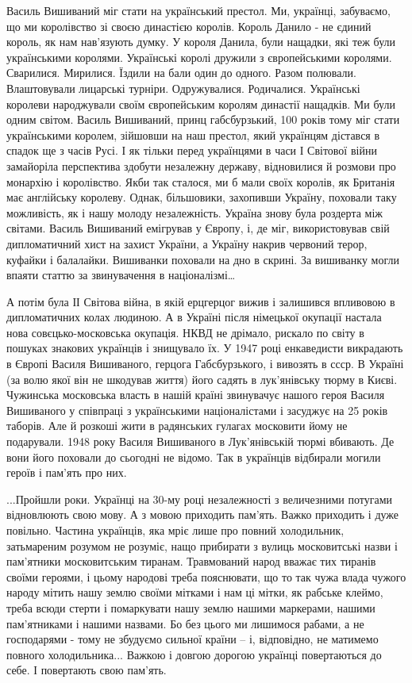 Василь Вишиваний міг стати на український престол. Ми, українці, забуваємо, що
ми королівство зі своєю династією королів. Король Данило - не єдиний король, як
нам нав'язують думку. У короля Данила, були нащадки, які теж були українськими
королями. Українські королі дружили з європейськими королями. Сварилися.
Мирилися. Їздили на бали один до одного. Разом полювали. Влаштовували лицарські
турніри. Одружувалися. Родичалися. Українські королеви народжували своїм
європейським королям династії нащадків. Ми були одним світом. Василь Вишиваний,
принц габсбурзький, 100 років тому міг стати українськими королем, зійшовши на
наш престол, який українцям дістався в спадок ще з часів Русі. І як тільки
перед українцями в часи І Світової війни замайоріла перспектива здобути
незалежну державу, відновилися й розмови про монархію і королівство. Якби так
сталося, ми б мали своїх королів, як Британія має англійську королеву. Однак,
більшовики, захопивши Україну, поховали таку можливість, як і нашу молоду
незалежність. Україна знову була роздерта між світами. Василь Вишиваний
емігрував у Європу, і, де міг, використовував свій дипломатичний хист на захист
України, а Україну накрив червоний терор, куфайки і балалайки. Вишиванки
поховали на дно в скрині. За вишиванку могли впаяти статтю за звинувачення в
націоналізмі…

А потім була ІІ Світова війна, в якій ерцгерцог вижив і залишився впливовою в
дипломатичних колах людиною. А в Україні після німецької окупації настала нова
совєцько-московська окупація. НКВД не дрімало, рискало по світу в пошуках
знакових українців і знищувало їх. У 1947 році енкаведисти викрадають в Європі
Василя Вишиваного, герцога Габсбурзького, і вивозять в ссср. В Україні (за волю
якої він не шкодував життя) його садять в лук'янівську тюрму в Києві. Чужинська
московська власть в нашій країні звинувачує нашого героя Василя Вишиваного у
співпраці з українськими націоналістами і засуджує на 25 років таборів. Але й
розкоші жити в радянських гулагах московити йому не подарували. 1948 року
Василя Вишиваного в Лук'янівській тюрмі вбивають. Де вони його поховали до
сьогодні не відомо. Так в українців відбирали могили героїв і пам'ять про них. 

...Пройшли роки. Українці на 30-му році незалежності з величезними потугами
відновлюють свою мову. А з мовою приходить пам'ять. Важко приходить і дуже
повільно. Частина українців, яка мріє лише про повний холодильник,  затьмареним
розумом не розуміє, нащо прибирати з вулиць московитські назви і пам'ятники
московитським тиранам. Травмований народ вважає тих тиранів своїми героями, і
цьому народові треба пояснювати, що то так чужа влада чужого народу мітить нашу
землю своїми мітками і нам ці мітки, як рабське клеймо, треба всюди стерти і
помаркувати нашу землю нашими маркерами, нашими пам'ятниками і нашими назвами.
Бо без цього ми лишимося рабами, а не господарями - тому не збудуємо сильної
країни – і, відповідно, не матимемо повного холодильника... Важкою і довгою
дорогою українці повертаються до себе. І повертають свою пам'ять. 

